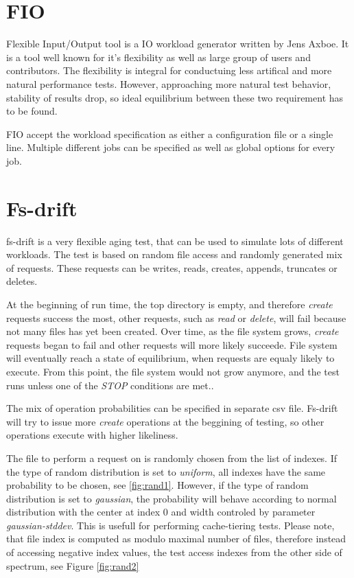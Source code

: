 \documentclass[
  color, %
  table, %
  lof,   %
  lot,   %
]{fithesis3}
\begin{document}
\section{FIO}
Flexible Input/Output tool is a IO workload generator written by Jens Axboe. It is a tool well known for it's flexibility as well as large group of users and contributors. The flexibility is integral for conductuing less artifical and more natural performance tests. However, approaching more natural test behavior, stability of results drop, so ideal equilibrium between these two requirement has to be found.

FIO accept the workload specification as either a configuration file or a single line. Multiple different jobs can be specified as well as global options for every job. 


 

\section{Fs-drift}
fs-drift is a very flexible aging test, that can be used to simulate lots of different workloads. The test is based on random file access and randomly generated mix of requests. These requests can be writes, reads, creates, appends, truncates or deletes.

At the beginning of run time, the top directory is empty, and therefore \textit{create} requests success the most, other requests, such as \textit{read} or \textit{delete}, will fail because not many files has yet been created. Over time, as the file system grows, \textit{create} requests began to fail and other requests will more likely succeede. File system will eventually reach a state of equilibrium, when requests are equaly likely to execute. From this point, the file system would not grow anymore, and the test runs unless one of the \textit{STOP} conditions are met..

The mix of operation probabilities can be specified in separate csv file. Fs-drift will try to issue more \textit{create} operations at the beggining of testing, so other operations execute with higher likeliness.

The file to perform a request on is randomly chosen from the list of indexes. If the type of random distribution is set to \textit{uniform}, all indexes have the same probability to be chosen, see \ref{fig:rand1}. However, if the type of random distribution is set to \textit{gaussian}, the probability will behave according to normal distribution with the center at index 0 and width controled by parameter \textit{gaussian-stddev}. This is usefull for performing cache-tiering tests. Please note, that file index is computed as modulo maximal number of files, therefore instead of accessing negative index values, the test access indexes from the other side of spectrum, see Figure \ref{fig:rand2}
\end{document}
